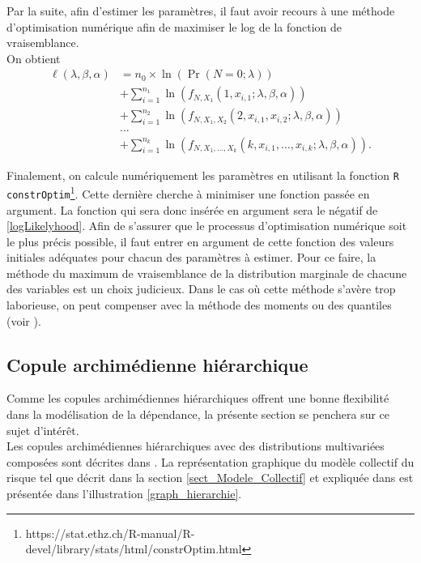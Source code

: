 \documentclass{article}
\begin{document}
		Par la suite, afin d'estimer les paramètres, il faut avoir recours à une méthode d'optimisation numérique afin de maximiser le log de la fonction de vraisemblance.\\
		
		On obtient
		\begin{align}
		\ell(\lambda, \beta, \alpha) 
		&= n_0 \times \ln \left( \Pr (N=0 ; \lambda) \right) \nonumber\\
		& + \sum_{i=1}^{n_1} \ln \left(f_{N,X_1}(1,x_{i,1};\lambda,\beta, \alpha) \right) \nonumber \\
		& + \sum_{i=1}^{n_2} \ln \left(f_{N,X_1,X_2}(2,x_{i,1},x_{i,2};\lambda,\beta, \alpha)\right) \label{logLikelyhood} \\
		& \dots \nonumber\\
		& + \sum_{i=1}^{n_k} \ln \left( f_{N,X_1,\dots,X_k}(k,x_{i,1},\dots,x_{i,k};\lambda,\beta, \alpha)\right). \nonumber
		\end{align}
		
		Finalement, on calcule numériquement les paramètres en utilisant la fonction \texttt{R} \texttt{constrOptim}\footnote{https://stat.ethz.ch/R-manual/R-devel/library/stats/html/constrOptim.html}. Cette dernière cherche à minimiser une fonction passée en argument. La fonction qui sera donc insérée en argument sera le négatif de \eqref{logLikelyhood}.
		Afin de s'assurer que le processus d'optimisation numérique soit le plus précis possible, il faut entrer en argument de cette fonction des valeurs initiales adéquates pour chacun des paramètres à estimer. Pour ce faire, la méthode du maximum de vraisemblance de la distribution marginale de chacune des variables est un choix judicieux. Dans le cas où cette méthode s'avère trop laborieuse, on peut compenser avec la méthode des moments ou des quantiles (voir \cite{LossModels_Klugman2012}).
		

	\subsection{Copule archimédienne hiérarchique}	
		Comme les copules archimédiennes hiérarchiques offrent une bonne flexibilité dans la modélisation de la dépendance, la présente section se penchera sur ce sujet d'intérêt.\\
		
		Les copules archimédiennes hiérarchiques avec des distributions multivariées composées sont décrites dans \cite{Itre4}. La représentation graphique du modèle collectif du risque tel que décrit dans la section \ref{sect_Modele_Collectif} et expliquée dans \cite{Itre5} est présentée dans l'illustration \ref{graph_hierarchie}.
		
\end{document}
